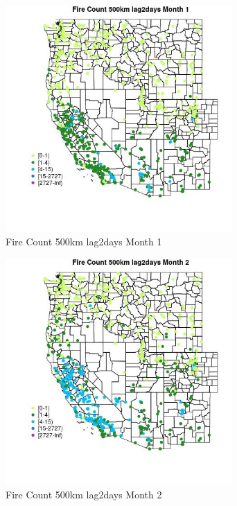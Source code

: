 \begin{figure} 
\centering  
\includegraphics[width=0.77\textwidth]{Code_Outputs/Report_ML_input_PM25_Step4_part_f_de_duplicated_aves_prioritize_24hr_obswNAs_MapObsMo1Fire_Count_500km_lag2days.jpg} 
\caption{\label{fig:Report_ML_input_PM25_Step4_part_f_de_duplicated_aves_prioritize_24hr_obswNAsMapObsMo1Fire_Count_500km_lag2days}Fire Count 500km lag2days Month 1} 
\end{figure} 
 

\begin{figure} 
\centering  
\includegraphics[width=0.77\textwidth]{Code_Outputs/Report_ML_input_PM25_Step4_part_f_de_duplicated_aves_prioritize_24hr_obswNAs_MapObsMo2Fire_Count_500km_lag2days.jpg} 
\caption{\label{fig:Report_ML_input_PM25_Step4_part_f_de_duplicated_aves_prioritize_24hr_obswNAsMapObsMo2Fire_Count_500km_lag2days}Fire Count 500km lag2days Month 2} 
\end{figure} 
 

